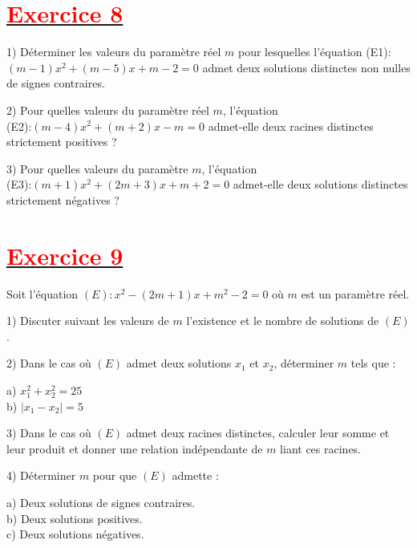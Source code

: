 \documentclass[12pt]{article}
\begin{document}
\section*{\underline{\textbf{\textcolor{red}{Exercice 8}}}}
1) Déterminer les valeurs du paramètre réel \( m \) pour lesquelles l'équation 
(E1):\( (m - 1)x^2 + (m - 5)x + m - 2 = 0 \) admet deux solutions distinctes non nulles de signes contraires.

2) Pour quelles valeurs du paramètre réel \( m \), l'équation\\ 
(E2):\( (m - 4)x^2 + (m + 2)x - m = 0 \) admet-elle deux racines distinctes strictement positives ?

3) Pour quelles valeurs du paramètre \( m \), l'équation\\ 
(E3):\( (m + 1)x^2 + (2m + 3)x + m + 2 = 0 \) admet-elle deux solutions distinctes strictement négatives ?
\section*{\underline{\textbf{\textcolor{red}{Exercice 9}}}}
Soit l'équation \( (E) : x^2 - (2m + 1)x + m^2 - 2 = 0 \) où \( m \) est un paramètre réel.

1) Discuter suivant les valeurs de \( m \) l'existence et le nombre de solutions de 
\( (E) \).

2) Dans le cas où \( (E) \) admet deux solutions \( x_1 \) et \( x_2 \), déterminer \( m \) tels que :

a) \( x_1^2 + x_2^2 = 25 \) \\
b) \( |x_1 - x_2| = 5 \)

3) Dans le cas où \( (E) \) admet deux racines distinctes, calculer leur somme et leur produit et donner une relation indépendante de \( m \) liant ces racines.

4) Déterminer \( m \) pour que \( (E) \) admette :

a) Deux solutions de signes contraires. \\
b) Deux solutions positives. \\
c) Deux solutions négatives.
\end{document}
